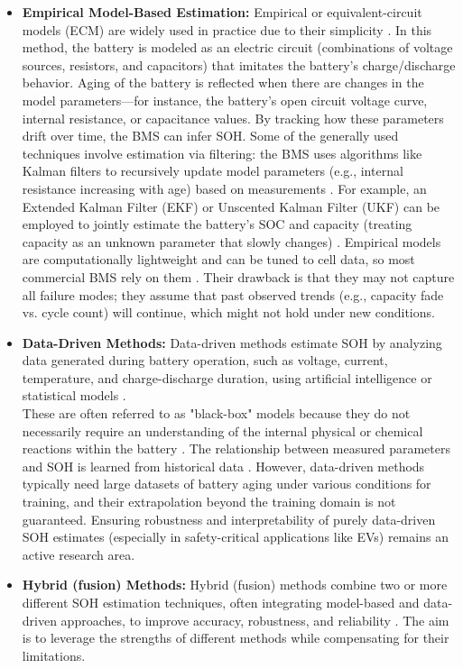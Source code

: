 \begin{itemize}
    \item \textbf{Empirical Model-Based Estimation:} Empirical or equivalent-circuit models (ECM) are widely used in practice due to their simplicity \cite{energies-13-02825-v2}. In this method, the battery is modeled as an electric circuit (combinations of voltage sources, resistors, and capacitors) that imitates the battery's charge/discharge behavior. Aging of the battery is reflected when there are changes in the model parameters—for instance, the battery's open circuit voltage curve, internal resistance, or capacitance values. By tracking how these parameters drift over time, the BMS can infer SOH. Some of the generally used techniques involve estimation via filtering: the BMS uses algorithms like Kalman filters to recursively update model parameters (e.g., internal resistance increasing with age) based on measurements \cite{wevj-12-00113}. For example, an Extended Kalman Filter (EKF) or Unscented Kalman Filter (UKF) can be employed to jointly estimate the battery’s SOC and capacity (treating capacity as an unknown parameter that slowly changes) \cite{wevj-12-00113}. Empirical models are computationally lightweight and can be tuned to cell data, so most commercial BMS rely on them \cite{energies-13-02825-v2}. Their drawback is that they may not capture all failure modes; they assume that past observed trends (e.g., capacity fade vs. cycle count) will continue, which might not hold under new conditions.
    \item \textbf{Data-Driven Methods:} Data-driven methods estimate SOH by analyzing data generated during battery operation, such as voltage, current, temperature, and charge-discharge duration, using artificial intelligence or statistical models \cite{wevj-12-00113}\cite{energies-13-01811-v2}\cite{electronics-13-01675}\cite{energies-13-02825-v2}.\\ These are often referred to as "black-box" models because they do not necessarily require an understanding of the internal physical or chemical reactions within the battery \cite{electronics-13-01675}. The relationship between measured parameters and SOH is learned from historical data \cite{wevj-12-00113}\cite{electronics-13-01675}. However, data-driven methods typically need large datasets of battery aging under various conditions for training, and their extrapolation beyond the training domain is not guaranteed. Ensuring robustness and interpretability of purely data-driven SOH estimates (especially in safety-critical applications like EVs) remains an active research area.
    \item \textbf{Hybrid (fusion) Methods:}\cite{electronics-13-01675}\cite{energies-13-01811-v2} Hybrid (fusion) methods combine two or more different SOH estimation techniques, often integrating model-based and data-driven approaches, to improve accuracy, robustness, and reliability \cite{wevj-12-00113}. The aim is to leverage the strengths of different methods while compensating for their limitations.
\end{itemize}